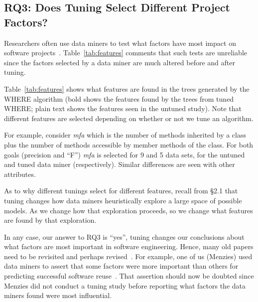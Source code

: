 \documentclass{sig-alternative}
\newcommand{\tab}[1]{Table~\ref{tab:#1}}
\begin{document}
 \subsection{RQ3: Does Tuning Select Different Project Factors? }\label{sect:import}


Researchers often use data miners to  test what factors have most impact on software projects~\cite{bell2013limited,rahman2013how,me02k,Moser:2008,zimmermann2007predicting,herzig2013predicting}. 
\tab{features} comments that such tests are unreliable since the factors selected by a data miner are much altered before and 
after tuning.

\tab{features} shows what features are found in the trees generated by the WHERE algorithm
(bold shows the features found by the trees from tuned WHERE; plain text shows the features seen
in the untuned study). Note that different features are selected depending on whether or not
we tune an algorithm.

For example, consider {\em mfa} which is the
number of methods inherited by a class plus the number of methods accessible by member methods of the class.
For both goals (precision and ``F'') {\em mfa} is selected for 9 and 5 data sets,
for the untuned and tuned data miner (respectively).
Similar differences are   seen with other attributes.

As to why different tunings select for different features,  recall from {\S}2.1 that tuning changes how data miners
heuristically explore a large space of possible models. As we change how that exploration proceeds,
so we change what features are found by that exploration.

In any case, our answer to RQ3 is ``yes'', tuning changes our
conclusions about what factors are most important in software engineering.
Hence, many old papers    need to be revisited  and perhaps revised~\cite{bell2013limited,rahman2013how,me02k,Moser:2008,zimmermann2007predicting,herzig2013predicting}.  
For example, one of us (Menzies) used data miners
to assert that some factors were more important than others for predicting
successful software reuse~\cite{me02k}. That assertion should now be doubted since Menzies did not conduct a tuning study before reporting what factors the data miners
found were most influential.
\end{document}
